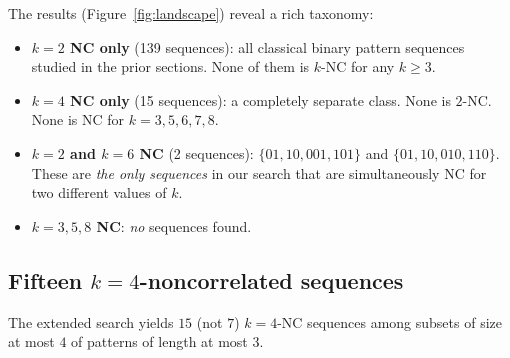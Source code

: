 \documentclass[11pt]{article}
\theoremstyle{definition}
\begin{document}
The results (Figure~\ref{fig:landscape}) reveal a rich taxonomy:

\begin{itemize}
\item \textbf{$k = 2$ NC only} (139 sequences): all classical binary
    pattern sequences studied in the prior sections.  None of them is
    $k$-NC for any $k \geq 3$.
\item \textbf{$k = 4$ NC only} (15 sequences): a completely separate
    class.  None is $2$-NC.  None is NC for $k = 3, 5, 6, 7, 8$.
\item \textbf{$k = 2$ and $k = 6$ NC} (2 sequences): $\{01, 10, 001, 101\}$
    and $\{01, 10, 010, 110\}$.  These are \emph{the only sequences}
    in our search that are simultaneously NC for two different values
    of $k$.
\item \textbf{$k = 3, 5, 8$ NC}: \emph{no} sequences found.
\end{itemize}

\subsection{Fifteen $k=4$-noncorrelated sequences}

The extended search yields $15$ (not $7$) $k=4$-NC sequences among
subsets of size at most $4$ of patterns of length at most $3$.
\end{document}
